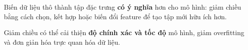 \begin{phuongphap}[title={Trích xuất đặc trưng (Feature Extraction)}]
Biến dữ liệu thô thành tập đặc trưng \textbf{có ý nghĩa} hơn cho mô hình: giảm chiều bằng cách chọn, kết hợp hoặc biến đổi feature để tạo tập mới hữu ích hơn.
\end{phuongphap}

\begin{tinhchat}[title={Lợi ích tổng quát}]
Giảm chiều có thể cải thiện \textbf{độ chính xác và tốc độ} mô hình, giảm overfitting và đơn giản hóa trực quan hóa dữ liệu.
\end{tinhchat}

